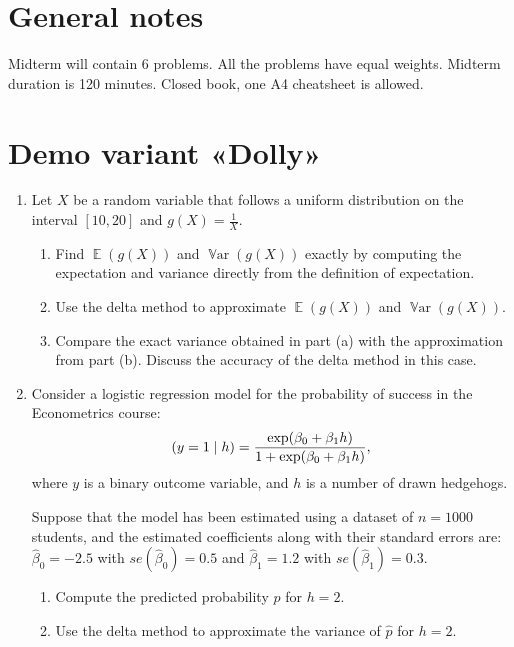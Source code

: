 \documentclass[12pt]{article}
\DeclareMathOperator{\Var}{\mathbb{V}ar}
\let\P\relax
\DeclareMathOperator{\P}{\mathbb{P}}
\DeclareMathOperator{\E}{\mathbb{E}}
\newcommand{\hb}{\hat\beta}
\begin{document}
\section*{General notes}

Midterm will contain 6 problems. 
All the problems have equal weights. 
Midterm duration is 120 minutes. 
Closed book, one A4 cheatsheet is allowed.

\section*{Demo variant «Dolly»}
\begin{enumerate}
    \item Let $X$ be a random variable that follows a uniform distribution on the interval $[10,20]$ and 
    $g(X) = \frac{1}{X}$.
    
    \begin{enumerate}
        \item Find $\E(g(X))$ and $\Var(g(X))$ exactly by computing the expectation and variance directly from the definition of expectation.
        
        \item Use the delta method to approximate $\E(g(X))$ and $\Var(g(X))$.
        
        \item Compare the exact variance obtained in part (a) with the approximation from part (b). 
        Discuss the accuracy of the delta method in this case.
    \end{enumerate}
    \item Consider a logistic regression model for the probability of success in the Econometrics course:
    \[
    \P(y = 1 \mid h) = \frac{\exp(\beta_0 + \beta_1 h)}{1 + \exp(\beta_0 + \beta_1 h)},
    \]
    where $y$ is a binary outcome variable, and $h$ is a number of drawn hedgehogs.
    
    Suppose that the model has been estimated using a dataset of $n = 1000$ students, 
    and the estimated coefficients along with their standard errors are:
    $\hb_0 = -2.5$ with $se(\hb_0) = 0.5$ and  $\hb_1 = 1.2$ with $se(\hb_1) = 0.3$.
    
    \begin{enumerate}
        \item Compute the predicted probability $\hat{p}$ for $h = 2$.
    
        \item Use the delta method to approximate the variance of $\hat{p}$ for $h = 2$.
    

\end{enumerate}
\end{enumerate}
\end{document}
